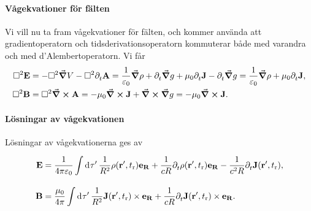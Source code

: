 \paragraph{Vågekvationer för fälten}
Vi vill nu ta fram vågekvationer för fälten, och kommer använda att gradientoperatorn och tidsderivationsoperatorn kommuterar både med varandra och med d'Alembertoperatorn. Vi får
\begin{align*}
	\Box^{2}{\vb{E}} &= -\Box^{2}{\grad{V}} - \Box^{2}{\partial_{t}^{}\vb{A}} = \frac{1}{\varepsilon_{0}}\grad{\rho} + \partial_{t}^{}\grad{g} + \mu_{0}\partial_{t}^{}\vb{J} - \partial_{t}^{}\grad{g} = \frac{1}{\varepsilon_{0}}\grad{\rho} + \mu_{0}\partial_{t}^{}\vb{J}, \\
	\Box^{2}{\vb{B}} &= \Box^{2}{\curl{\vb{A}}} = -\mu_{0}\curl{\vb{J}} + \curl{\grad{g}} = -\mu_{0}\curl{\vb{J}}.
\end{align*}

\paragraph{Lösningar av vågekvationen}
Lösningar av vågekvationerna ges av
\begin{align*}
	\vb{E} &= \frac{1}{4\pi\varepsilon_{0}}\int\limits_{}^{}\dd[]{\tau'}\frac{1}{R^{2}}\rho(\vb{r}', t_{\text{r}})\vb{e}_{\vb{R}} + \frac{1}{cR}\partial_{t}^{}\rho(\vb{r}', t_{\text{r}})\vb{e}_{\vb{R}} - \frac{1}{c^{2}R}\partial_{t}^{}\vb{J}(\vb{r}', t_{\text{r}}), \\
	\vb{B} &= \frac{\mu_{0}}{4\pi}\int\limits_{}^{}\dd[]{\tau'}\frac{1}{R^{2}}\vb{J}(\vb{r}', t_{\text{r}})\times\vb{e}_{\vb{R}} + \frac{1}{cR}\partial_{t}^{}\vb{J}(\vb{r}', t_{\text{r}})\times\vb{e}_{\vb{R}}.
\end{align*}

